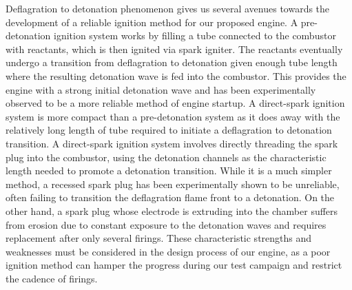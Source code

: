 Deflagration to detonation phenomenon gives us several avenues towards the development of a reliable ignition method for our proposed engine. A pre-detonation ignition system works by filling a tube connected to the combustor with reactants, which is then ignited via spark igniter. The reactants eventually undergo a transition from deflagration to detonation given enough tube length where the resulting detonation wave is fed into the combustor. This provides the engine with a strong initial detonation wave and has been experimentally observed to be a more reliable method of engine startup. A direct-spark ignition system is more compact than a pre-detonation system as it does away with the relatively long length of tube required to initiate a deflagration to detonation transition. A direct-spark ignition system involves directly threading the spark plug into the combustor, using the detonation channels as the characteristic length needed to promote a detonation transition. While it is a much simpler method, a recessed spark plug has been experimentally shown to be unreliable, often failing to transition the deflagration flame front to a detonation. On the other hand, a spark plug whose electrode is extruding into the chamber suffers from erosion due to constant exposure to the detonation waves \cite{dechert:2020} and requires replacement after only several firings. These characteristic strengths and weaknesses must be considered in the design process of our engine, as a poor ignition method can hamper the progress during our test campaign and restrict the cadence of firings.